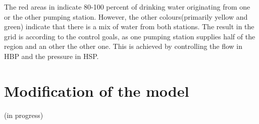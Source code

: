 \vspace{-3mm}

The red areas in  indicate 80-100 percent of drinking water originating from one or the other pumping station. However, the other colours(primarily yellow and green) indicate that there is a mix of water from both stations. The result in the grid is according to the control goals, as one pumping station supplies half of the region and an other the other one. This is achieved by controlling the flow in HBP and the pressure in HSP. 

\section{Modification of the model}
\label{modification_model}

(in progress)